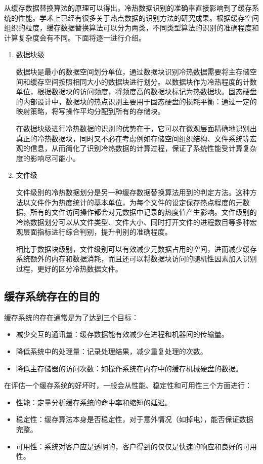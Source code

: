 从缓存数据替换算法的原理可以得出，冷热数据识别的准确率直接影响到了缓存系统的性能。学术上已经有很多关于热点数据的识别方法的研究成果。根据缓存空间组织的粒度，缓存数据替换算法可以分为两类，不同类型算法的识别的准确程度和计算复杂度会有不同。下面将逐一进行介绍。

\begin{enumerate}
\item 数据块级

数据块是最小的数据空间划分单位，通过数据块识别冷热数据需要将主存储空间和缓存空间按照相同大小的数据块进行划分。以数据块作为冷热程度的计数单位，根据数据块的访问频度，将频度高的数据块标记为热数据块。固态硬盘的内部设计中，数据块的热点识别主要用于固态硬盘的损耗平衡：通过一定的映射策略，将写操作平均分配到所有的存储块。

在数据块级进行冷热数据的识别的优势在于，它可以在微观层面精确地识别出真正的冷热数据块，同时又不必在考虑例如存储空间组织结构、文件系统等宏观的信息，从而简化了识别冷热数据的计算过程，保证了系统性能受计算复杂度的影响尽可能小。

\item 文件级

文件级别的冷热数据划分\cite{linlin2011}是另一种缓存数据替换算法用到的判定方法。这种方法以文件作为热度统计的基本单位，为每个文件的设定保存热点程度的元数据，所有的文件访问操作都会对元数据中记录的热度值产生影响。文件级别的冷热数据划分可以从文件类型、文件大小、同时打开文件的进程数目等多种宏观层面指标进行综合判别，提升判别的准确程度。

相比于数据块级别，文件级别可以有效减少元数据占用的空间，进而减少缓存系统额外的内存和数据消耗，而且还可以将数据块访问的随机性因素加入识别过程，更好的区分冷热数据文件。
\end{enumerate}

\subsection{缓存系统存在的目的}
缓存系统的存在通常是为了达到三个目标：
\begin{itemize}
\item 减少交互的通讯量：缓存数据能有效减少在进程和机器间的传输量。
\item 降低系统中的处理量：记录处理结果，减少重复处理的次数。
\item 降低主存储器的访问次数：如操作系统在内存中的缓存机械硬盘的数据。
\end{itemize}

在评估一个缓存系统的好坏时，一般会从性能、稳定性和可用性三个方面进行：
\begin{itemize}
\item 性能：定量分析缓存系统的命中率和缩短的延迟。
\item 稳定性：缓存算法本身是否稳定性，对于意外情况（如掉电），能否保证数据完整。
\item 可用性：系统对客户应是透明的，客户得到的仅仅是快速的响应和良好的可用性。
\end{itemize}

